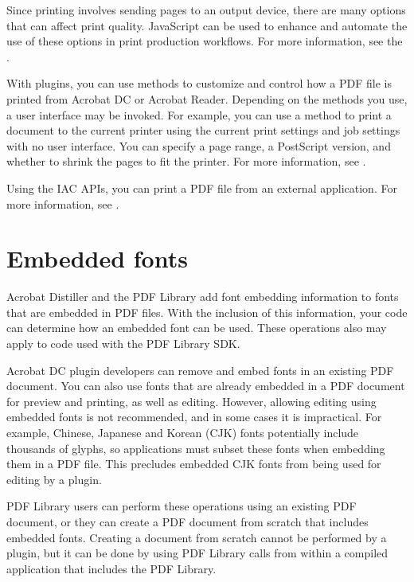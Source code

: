 \documentclass[letterpaper,12pt,english,openany,oneside]{sphinxmanual}
\begin{document}
Since printing involves sending pages to an output device, there are many options that can affect print quality. JavaScript can be used to enhance and automate the use of these options in print production workflows. For more information, see the  .

With plug\sphinxhyphen{}ins, you can use methods to customize and control how a PDF file is printed from Acrobat DC or Acrobat Reader. Depending on the methods you use, a user interface may be invoked. For example, you can use a method to print a document to the current printer using the current print settings and job settings with no user interface. You can specify a page range, a PostScript version, and whether to shrink the pages to fit the printer. For more information, see  .

Using the IAC APIs, you can print a PDF file from an external application. For more information, see  .




\section{Embedded fonts}
\label{\detokenize{Overview_Editing:embedded-fonts}}
Acrobat Distiller and the PDF Library add font embedding information to fonts that are embedded in PDF files. With the inclusion of this information, your code can determine how an embedded font can be used. These operations also may apply to code used with the PDF Library SDK.

Acrobat DC plug\sphinxhyphen{}in developers can remove and embed fonts in an existing PDF document. You can also use fonts that are already embedded in a PDF document for preview and printing, as well as editing. However, allowing editing using embedded fonts is not recommended, and in some cases it is impractical. For example, Chinese, Japanese and Korean (CJK) fonts potentially include thousands of glyphs, so applications must subset these fonts when embedding them in a PDF file. This precludes embedded CJK fonts from being used for editing by a plug\sphinxhyphen{}in.

PDF Library users can perform these operations using an existing PDF document, or they can create a PDF document from scratch that includes embedded fonts. Creating a document from scratch cannot be performed by a plug\sphinxhyphen{}in, but it can be done by using PDF Library calls from within a compiled application that includes the PDF Library.
\end{document}

